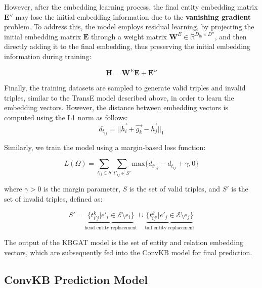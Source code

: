 However, after the embedding learning process, the final entity embedding matrix $\mathbf{E}''$ may lose the initial embedding information due to the \textbf{vanishing gradient} problem. To address this, the model employs residual learning, by projecting the initial embedding matrix $\mathbf{E}$ through a weight matrix $\mathbf{W}^E \in \mathbb{R}^{D_{\text{in}} \times D''}$, and then directly adding it to the final embedding, thus preserving the initial embedding information during training:

\begin{equation}
	\label{eq:reInitEmbedding}
	\mathbf{H} = \mathbf{W}^E \mathbf{E} + \mathbf{E''}
\end{equation}

Finally, the training datasets are sampled to generate valid triples and invalid triples, similar to the TransE model described above, in order to learn the embedding vectors. However, the distance between embedding vectors is computed using the L1 norm as follows:
\[
d_{t_{ij}} = \big|\big|\vec{h_i}+ \vec{g_k}-\vec{h_j}\big|\big|_1
\]

Similarly, we train the model using a margin-based loss function:

\begin{equation}
	L(\Omega)=\sum_{t_{ij} \in S} \sum_{t'_{ij} \in S'} \text{max}\{d_{t'_{ij}} - d_{t_{ij}} + \gamma , 0 \}
\end{equation}

where $\gamma > 0$ is the margin parameter, $S$ is the set of valid triples, and $S'$ is the set of invalid triples, defined as:

\begin{equation}
	{S'} ={\underbrace{\{ t^k_{i'j} | e'_i \in \mathcal{E}\setminus e_i\}}_{\text{head entity replacement}} \cup \underbrace{\{ t^k_{ij'} | e'_j \in \mathcal{E}\setminus e_j\}}_{\text{tail entity replacement}}}
\end{equation}

The output of the KBGAT model is the set of entity and relation embedding vectors, which are subsequently fed into the ConvKB model for final prediction.




\subsection{ConvKB Prediction Model}
\label{sec:predictionConvKB}

